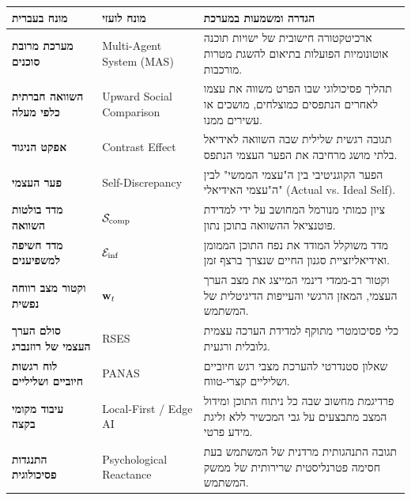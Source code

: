 \begin{table}[H]
\centering
\small
\begin{tabularx}{\textwidth}{>{\bfseries\color{DarkPurple}}p{3.4cm} p{5.0cm} X}
\toprule
\rowcolor{LavenderCard}
\textbf{\color{DarkPurple}מונח בעברית} & \textbf{\color{DarkPurple}מונח לועזי} & \textbf{\color{DarkPurple}הגדרה ומשמעות במערכת \projectname{}} \\
\midrule
מערכת מרובת סוכנים & \textenglish{Multi-Agent System (MAS)} & ארכיטקטורה חישובית של ישויות תוכנה אוטונומיות הפועלות בתיאום להשגת מטרות מורכבות. \\
השוואה חברתית כלפי מעלה & \textenglish{Upward Social Comparison} & תהליך פסיכולוגי שבו הפרט משווה את עצמו לאחרים הנתפסים כמוצלחים, מושכים או עשירים ממנו. \\
אפקט הניגוד & \textenglish{Contrast Effect} & תגובה רגשית שלילית שבה השוואה לאידיאל בלתי מושג מרחיבה את הפער העצמי הנתפס. \\
פער העצמי & \textenglish{Self-Discrepancy} & הפער הקוגניטיבי בין ה"עצמי הממשי" לבין ה"עצמי האידיאלי" (\textenglish{Actual vs. Ideal Self}). \\
מדד בולטות השוואה & \textenglish{$\mathcal{S}_{\text{comp}}$} & ציון כמותי מנורמל המחושב על ידי \agentAnalyst{} למדידת פוטנציאל ההשוואה בתוכן נתון. \\
מדד חשיפה למשפיענים & \textenglish{$\mathcal{E}_{\text{inf}}$} & מדד משוקלל המודד את נפח התוכן הממומן ואידיאליזציית סגנון החיים שנצרך ברצף זמן. \\
וקטור מצב רווחה נפשית & \textenglish{$\mathbf{w}_t$} & וקטור רב-ממדי דינמי המייצג את מצב הערך העצמי, המאזן הרגשי והעייפות הדיגיטלית של המשתמש. \\
סולם הערך העצמי של רוזנברג & \textenglish{RSES} & כלי פסיכומטרי מתוקף למדידת הערכה עצמית גלובלית ורגעית. \\
לוח רגשות חיוביים ושליליים & \textenglish{PANAS} & שאלון סטנדרטי להערכת מצבי רגש חיוביים ושליליים קצרי-טווח. \\
עיבוד מקומי בקצה & \textenglish{Local-First / Edge AI} & פרדיגמת מחשוב שבה כל ניתוח התוכן ומידול המצב מתבצעים על גבי המכשיר ללא זליגת מידע פרטי. \\
התנגדות פסיכולוגית & \textenglish{Psychological Reactance} & תגובה התנהגותית מרדנית של המשתמש בעת חסימה פטרנליסטית שרירותית של ממשק המשתמש. \\
\bottomrule
\end{tabularx}
\end{table}

